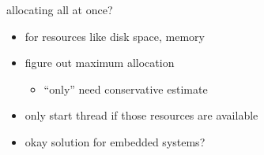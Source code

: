 \begin{frame}{allocating all at once?}
\begin{itemize}
\item for resources like disk space, memory
\vspace{.5cm}
\item figure out maximum allocation 
    \begin{itemize}
    \item ``only'' need conservative estimate
    \end{itemize}
\item only start thread if those resources are available
\vspace{.5cm}
\item okay solution for embedded systems?
\end{itemize}
\end{frame}
